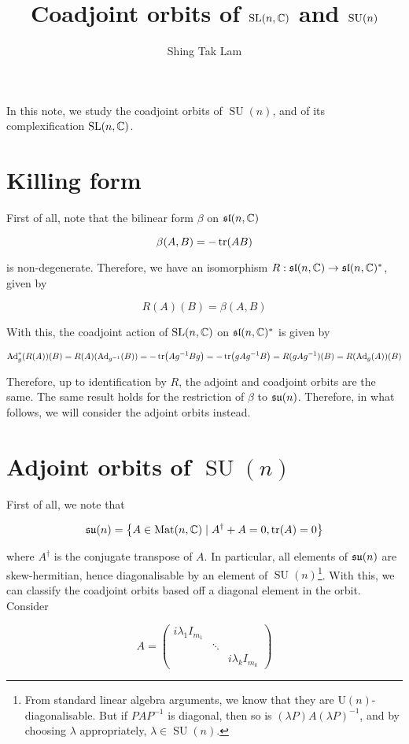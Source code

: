 \documentclass{article}
\title{Coadjoint orbits of \(\operatorname{SL}(n, \mathbb{C})\) and \(\SU(n)\)}
\author{Shing Tak Lam}
\renewcommand{\sl}{\mfs\mfl}
\DeclareMathOperator{\SU}{SU}
\newcommand{\su}{\mfs\mfu}
\newcommand{\rU}{\mathrm{U}}
\begin{document}
\maketitle

In this note, we study the coadjoint orbits of \(\SU(n)\), and of its complexification \(\operatorname{SL}(n, \mathbb{C})\).

\section{Killing form}

First of all, note that the bilinear form \(\beta\) on \(\sl(n, \C)\)

\[\beta(A, B) = -\tr(AB)\]

is non-degenerate. Therefore, we have an isomorphism \(R : \sl(n, \C) \to \sl(n, \C)^*\), given by

\[R(A)(B) = \beta(A, B)\]

With this, the coadjoint action of \(\operatorname{SL}(n, \mathbb{C})\) on \(\sl(n, \C)^*\) is given by

\[\operatorname{Ad}_g^*(R(A))(B) = R(A)(\operatorname{Ad}_{g^{-1}}(B)) = -\tr(Ag^{-1}Bg) = -\tr(gAg^{-1}B) = R(gAg^{-1})(B) = R(\operatorname{Ad}_g(A))(B)\]

Therefore, up to identification by \(R\), the adjoint and coadjoint orbits are the same. The same result holds for the restriction of \(\beta\) to \(\su(n)\). Therefore, in what follows, we will consider the adjoint orbits instead.

\section{Adjoint orbits of \(\SU(n)\)}

First of all, we note that

\[\su(n) = \left\{A \in \Mat(n, \C) \mid A^\dagger + A = 0, \tr(A) = 0\right\}\]

where \(A^\dagger\) is the conjugate transpose of \(A\). In particular, all elements of \(\su(n)\) are skew-hermitian, hence diagonalisable by an element of \(\SU(n)\)\footnote{From standard linear algebra arguments, we know that they are \(\rU(n)\)-diagonalisable. But if \(PAP^{-1}\) is diagonal, then so is \((\lambda P)A(\lambda P)^{-1}\), and by choosing \(\lambda\) appropriately, \(\lambda \in \SU(n)\).}. With this, we can classify the coadjoint orbits based off a diagonal element in the orbit. Consider

\[A = \begin{pmatrix}
    i\lambda_1 I_{m_1} \\
    & \ddots \\
    & & i\lambda_k I_{m_k}
\end{pmatrix}\]
\end{document}
